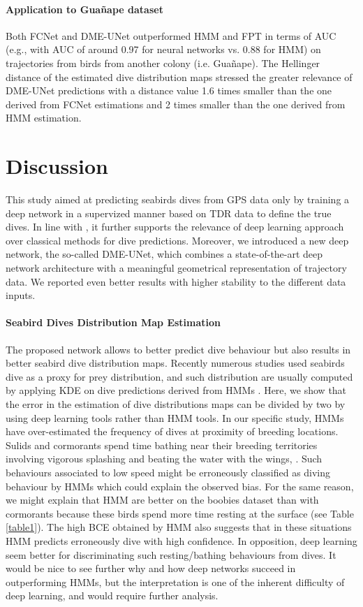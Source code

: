 \documentclass{article}
\begin{document}
\paragraph{Application to Gua\~nape  dataset}
Both FCNet and DME-UNet outperformed HMM and FPT in terms of AUC (e.g., with AUC of around 0.97 for neural networks vs. 0.88 for HMM) on trajectories from birds from another colony (i.e. Guañape). The Hellinger distance of the estimated dive distribution maps stressed the greater relevance of DME-UNet predictions with a distance value 1.6 times smaller than the one derived from FCNet estimations and 2 times smaller than the one derived from HMM estimation.

\section{Discussion}
This study aimed at predicting seabirds dives from GPS data only by training a deep network in a supervized manner based on TDR data to define the true dives.
In line with \citep{browning_predicting_2018}, it further  supports the relevance of deep learning approach over classical methods for dive predictions.
Moreover, we introduced a new deep network, the so-called DME-UNet, which combines a state-of-the-art deep network architecture with a meaningful geometrical representation of trajectory data. We reported even better results with higher stability to the different data inputs.

\paragraph{Seabird Dives Distribution Map Estimation}
The proposed network allows to better predict dive behaviour but also results in better seabird dive distribution maps. Recently numerous studies used seabirds dive as a proxy for prey distribution, and such distribution are usually computed by applying KDE on dive predictions derived from HMMs \citep{delord_movements_2020,weimerskirch_at-sea_2020}.
Here, we show that the error in the estimation of dive distributions maps can be divided by two by using deep learning tools rather than HMM tools. 
In our specific study, HMMs have over-estimated the frequency of dives at proximity of breeding locations. Sulids and cormorants  spend  time  bathing  near their breeding territories involving vigorous splashing and beating the water with the wings, \citep{nelson_pelicans_2005}. Such behaviours associated to low speed might be erroneously classified as diving behaviour by HMMs which could explain the observed bias. For the same reason, we might explain that HMM are better on the boobies dataset than with cormorants because these birds spend more time resting at the surface (see Table \ref{table1}). The high BCE obtained by HMM also suggests that in these situations HMM predicts erroneously dive with high confidence.
In opposition, deep learning seem better for discriminating such resting/bathing behaviours from dives. It would be nice to see further why and how deep networks succeed in outperforming HMMs, but the interpretation is one of the inherent difficulty  of deep learning, and would require further analysis.
\end{document}
